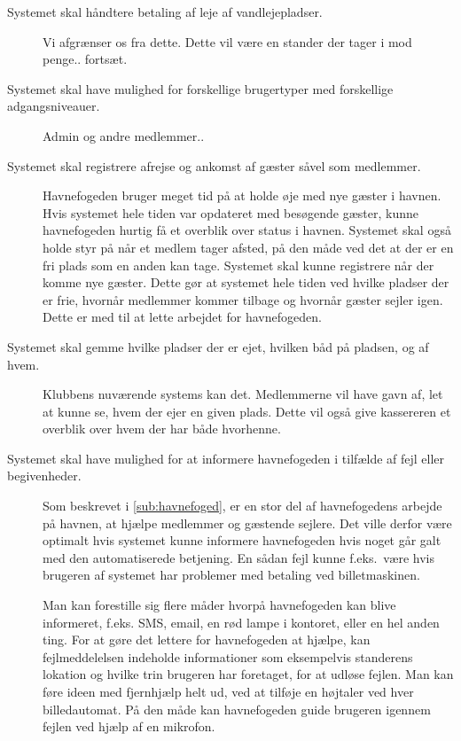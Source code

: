 \begin{description} 
  \item[Systemet skal håndtere betaling af leje af vandlejepladser.]

  Vi afgrænser os fra dette. Dette vil være en stander der tager i mod penge.. fortsæt. 

  \item[Systemet skal have mulighed for forskellige brugertyper med forskellige adgangsniveauer.]

    Admin og andre medlemmer..
  \item[Systemet skal registrere afrejse og ankomst af gæster såvel som medlemmer.] \hfill 


  Havnefogeden bruger meget tid på at holde øje med nye gæster i havnen. Hvis systemet hele tiden var opdateret med besøgende gæster, kunne havnefogeden hurtig få et overblik over status i havnen. Systemet skal også holde styr på når et medlem tager afsted, på den måde ved det at der er en fri plads som en anden kan tage. Systemet skal kunne registrere når der komme nye gæster. Dette gør at systemet hele tiden ved hvilke pladser der er frie, hvornår medlemmer kommer tilbage og hvornår gæster sejler igen. Dette er med til at lette arbejdet for havnefogeden.

  \item[Systemet skal gemme hvilke pladser der er ejet, hvilken båd på pladsen, og af hvem.]

  Klubbens nuværende systems kan det. Medlemmerne vil have gavn af, let at kunne se, hvem der ejer en given plads. Dette vil også give kassereren et overblik over hvem der har både hvorhenne.


  \item[Systemet skal have mulighed for at informere havnefogeden i tilfælde af fejl eller begivenheder.]

  Som beskrevet i \cref{sub:havnefoged}, er en stor del af havnefogedens arbejde på havnen, at hjælpe medlemmer og gæstende sejlere. Det ville derfor være optimalt hvis systemet kunne informere havnefogeden hvis noget går galt med den automatiserede betjening. En sådan fejl kunne f.eks.\ være hvis brugeren af systemet har problemer med betaling ved billetmaskinen.

  Man kan forestille sig flere måder hvorpå havnefogeden kan blive informeret, f.eks. SMS, email, en rød lampe i kontoret, eller en hel anden ting. For at gøre det lettere for havnefogeden at hjælpe, kan fejlmeddelelsen indeholde informationer som eksempelvis standerens lokation og hvilke trin brugeren har foretaget, for at udløse fejlen. Man kan føre ideen med fjernhjælp helt ud, ved at tilføje en højtaler ved hver billedautomat. På den måde kan havnefogeden guide brugeren igennem fejlen ved hjælp af en mikrofon.



\end{description}
